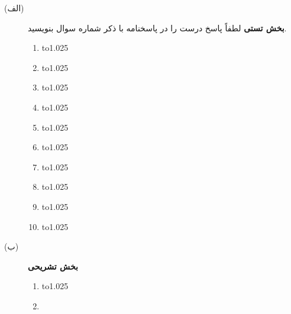 \documentclass[a4paper]{article}
\def\linebetw{\par\medskip\noindent\leavevmode\hbox to1.025\linewidth{\hrulefill}\par\bigskip}
\begin{document}
\begin{description}
		\item[(الف)] \textbf{بخش تستی}
				لطفاً پاسخ درست را در پاسخنامه با ذکر شماره سوال بنویسید. 
			\begin{enumerate}
	\vspace*{-0.2cm}
	\item \vspace*{-.5cm}
	\linebetw\vspace*{-.5cm}
	\item \vspace*{-.5cm}
	\linebetw\vspace*{-.5cm}
	\item \vspace*{-.5cm}
	\linebetw\vspace*{-.4cm}
	\item 
	\vspace*{-.5cm}
	\linebetw\vspace*{-.4cm}
	\item \vspace*{-.5cm}
	\linebetw\vspace*{-.5cm}
	\item \vspace*{-.5cm}
	\linebetw\vspace*{-.4cm}
	\item \vspace*{-.5cm}
	\linebetw\vspace*{-.4cm}
	\item \vspace*{-.5cm}
	\linebetw	 \vspace*{-.4cm}
	\item \vspace*{-.5cm}
	\linebetw \vspace*{-.3cm}
	\item %
	\linebetw  \vspace*{-.3cm}
		\end{enumerate}
\item[(ب)] \textbf{بخش تشریحی}
\fi
\begin{enumerate}
	\vspace*{-.2cm}
	\item 
	\linebetw
\vspace*{-.2cm}
	\item 

\end{enumerate}
\end{description}
\end{document}
